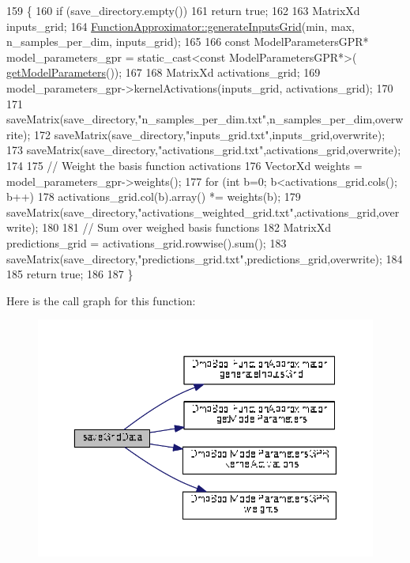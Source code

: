 \begin{DoxyCode}
159 \{
160   \textcolor{keywordflow}{if} (save\_directory.empty())
161     \textcolor{keywordflow}{return} \textcolor{keyword}{true};
162   
163   MatrixXd inputs\_grid;
164   \hyperlink{classDmpBbo_1_1FunctionApproximator_a61da4383ffab7d919c98d628c1d217d1}{FunctionApproximator::generateInputsGrid}(min, max, 
      n\_samples\_per\_dim, inputs\_grid);
165       
166   \textcolor{keyword}{const} ModelParametersGPR* model\_parameters\_gpr = \textcolor{keyword}{static\_cast<}\textcolor{keyword}{const }ModelParametersGPR*\textcolor{keyword}{>}(
      \hyperlink{classDmpBbo_1_1FunctionApproximator_a0e7e116ed9b159d782fca544dacb4bac}{getModelParameters}());
167 
168   MatrixXd activations\_grid;
169   model\_parameters\_gpr->kernelActivations(inputs\_grid, activations\_grid);
170   
171   saveMatrix(save\_directory,\textcolor{stringliteral}{"n\_samples\_per\_dim.txt"},n\_samples\_per\_dim,overwrite);
172   saveMatrix(save\_directory,\textcolor{stringliteral}{"inputs\_grid.txt"},inputs\_grid,overwrite);
173   saveMatrix(save\_directory,\textcolor{stringliteral}{"activations\_grid.txt"},activations\_grid,overwrite);
174 
175   \textcolor{comment}{// Weight the basis function activations  }
176   VectorXd weights = model\_parameters\_gpr->weights();
177   \textcolor{keywordflow}{for} (\textcolor{keywordtype}{int} b=0; b<activations\_grid.cols(); b++)
178     activations\_grid.col(b).array() *= weights(b);
179   saveMatrix(save\_directory,\textcolor{stringliteral}{"activations\_weighted\_grid.txt"},activations\_grid,overwrite);
180   
181   \textcolor{comment}{// Sum over weighed basis functions}
182   MatrixXd predictions\_grid = activations\_grid.rowwise().sum();
183   saveMatrix(save\_directory,\textcolor{stringliteral}{"predictions\_grid.txt"},predictions\_grid,overwrite);
184   
185   \textcolor{keywordflow}{return} \textcolor{keyword}{true};
186   
187 \}
\end{DoxyCode}


Here is the call graph for this function\+:
\nopagebreak
\begin{figure}[H]
\begin{center}
\leavevmode
\includegraphics[width=350pt]{classDmpBbo_1_1FunctionApproximatorGPR_a53d95f63de3b49491b1204f45a24ae25_cgraph}
\end{center}
\end{figure}




